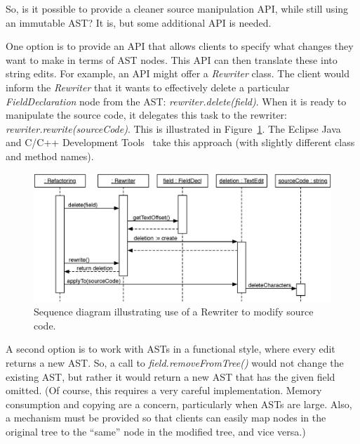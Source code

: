 \documentclass[prodmode]{acmlarge}
\begin{document}
So, is it possible to provide a cleaner source manipulation API, while still
using an immutable AST?  It is, but some additional API is needed.

One option is to provide an API that allows clients to specify what changes
they want to make in terms of AST nodes.  This API can then translate these
into string edits.  For example, an API might offer a \textit{Rewriter} class.
The client would inform the \textit{Rewriter} that it wants to effectively
delete a particular \textit{FieldDeclaration} node from the AST:
\textit{rewriter.delete(field)}.  When it is ready to manipulate the source
code, it delegates this task to the rewriter:
\textit{rewriter.rewrite(sourceCode)}.  This is illustrated in
Figure~\ref{fig:seq-diagram}.  The Eclipse Java and C/C++ Development
Tools~\cite{cdt-refactoring} take this approach (with slightly different class
and method names).

\begin{figure}[!bt]
\begin{center}
\includegraphics[width=.9\textwidth]{seq-diagram.eps}
\end{center}
\caption{Sequence diagram illustrating use of a Rewriter to modify source code.}
\label{fig:seq-diagram}
\end{figure}

A second option is to work with ASTs in a functional style, where every edit
returns a new AST.  So, a call to \textit{field.removeFromTree()} would not
change the existing AST, but rather it would return a new AST that has the
given field omitted.  (Of course, this requires a very careful implementation.
Memory consumption and copying are a concern, particularly when ASTs are large.
Also, a mechanism must be provided so that clients can easily map nodes in the
original tree to the ``same'' node in the modified tree, and vice versa.)

\end{document}
